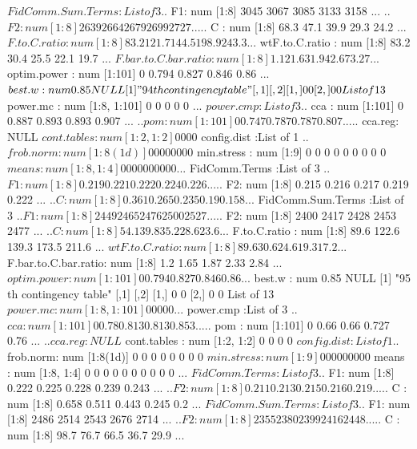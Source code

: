 \documentclass[11pt]{article} %
\begin{document}
\begin{Schunk}
\begin{Soutput}
 $ FidComm.Sum.Terms   :List of 3
  ..$ F1: num [1:8] 3045 3067 3085 3133 3158 ...
  ..$ F2: num [1:8] 2639 2664 2679 2699 2727 ...
  ..$ C : num [1:8] 68.3 47.1 39.9 29.3 24.2 ...
 $ F.to.C.ratio        : num [1:8] 83.2 121.7 144.5 198.9 243.3 ...
 $ wtF.to.C.ratio      : num [1:8] 83.2 30.4 25.5 22.1 19.7 ...
 $ F.bar.to.C.bar.ratio: num [1:8] 1.12 1.63 1.94 2.67 3.27 ...
 $ optim.power         : num [1:101] 0 0.794 0.827 0.846 0.86 ...
 $ best.w              : num 0.85
NULL
[1] "94 th contingency table"
     [,1] [,2]
[1,]    0    0
[2,]    0    0
List of 13
 $ power.mc            : num [1:8, 1:101] 0 0 0 0 0 ...
 $ power.cmp           :List of 3
  ..$ cca    : num [1:101] 0 0.887 0.893 0.893 0.907 ...
  ..$ pom    : num [1:101] 0 0.747 0.787 0.787 0.807 ...
  ..$ cca.reg: NULL
 $ cont.tables         : num [1:2, 1:2] 0 0 0 0
 $ config.dist         :List of 1
  ..$ frob.norm: num [1:8(1d)] 0 0 0 0 0 0 0 0
 $ min.stress          : num [1:9] 0 0 0 0 0 0 0 0 0
 $ means               : num [1:8, 1:4] 0 0 0 0 0 0 0 0 0 0 ...
 $ FidComm.Terms       :List of 3
  ..$ F1: num [1:8] 0.219 0.221 0.222 0.224 0.226 ...
  ..$ F2: num [1:8] 0.215 0.216 0.217 0.219 0.222 ...
  ..$ C : num [1:8] 0.361 0.265 0.235 0.19 0.158 ...
 $ FidComm.Sum.Terms   :List of 3
  ..$ F1: num [1:8] 2449 2465 2476 2500 2527 ...
  ..$ F2: num [1:8] 2400 2417 2428 2453 2477 ...
  ..$ C : num [1:8] 54.1 39.8 35.2 28.6 23.6 ...
 $ F.to.C.ratio        : num [1:8] 89.6 122.6 139.3 173.5 211.6 ...
 $ wtF.to.C.ratio      : num [1:8] 89.6 30.6 24.6 19.3 17.2 ...
 $ F.bar.to.C.bar.ratio: num [1:8] 1.2 1.65 1.87 2.33 2.84 ...
 $ optim.power         : num [1:101] 0 0.794 0.827 0.846 0.86 ...
 $ best.w              : num 0.85
NULL
[1] "95 th contingency table"
     [,1] [,2]
[1,]    0    0
[2,]    0    0
List of 13
 $ power.mc            : num [1:8, 1:101] 0 0 0 0 0 ...
 $ power.cmp           :List of 3
  ..$ cca    : num [1:101] 0 0.78 0.813 0.813 0.853 ...
  ..$ pom    : num [1:101] 0 0.66 0.66 0.727 0.76 ...
  ..$ cca.reg: NULL
 $ cont.tables         : num [1:2, 1:2] 0 0 0 0
 $ config.dist         :List of 1
  ..$ frob.norm: num [1:8(1d)] 0 0 0 0 0 0 0 0
 $ min.stress          : num [1:9] 0 0 0 0 0 0 0 0 0
 $ means               : num [1:8, 1:4] 0 0 0 0 0 0 0 0 0 0 ...
 $ FidComm.Terms       :List of 3
  ..$ F1: num [1:8] 0.222 0.225 0.228 0.239 0.243 ...
  ..$ F2: num [1:8] 0.211 0.213 0.215 0.216 0.219 ...
  ..$ C : num [1:8] 0.658 0.511 0.443 0.245 0.2 ...
 $ FidComm.Sum.Terms   :List of 3
  ..$ F1: num [1:8] 2486 2514 2543 2676 2714 ...
  ..$ F2: num [1:8] 2355 2380 2399 2416 2448 ...
  ..$ C : num [1:8] 98.7 76.7 66.5 36.7 29.9 ...

\end{Soutput}
\end{Schunk}
\end{document}

